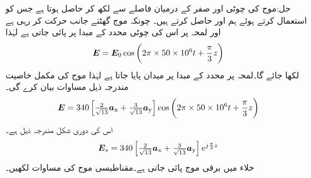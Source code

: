 حل:موج کی چوٹی اور صفر کے درمیان فاصلے سے  لکھ کر  حاصل ہوتا ہے جس کو استعمال کرتے ہوئے ہم    اور  حاصل کرتے  ہیں۔ چونکہ موج گھٹتے  جانب حرکت کر رہی ہے اور لمحہ  پر اس کی چوٹی محدد کے مبدا پر پائی جاتی ہے  لہٰذا 
\begin{align*}
{\ensuremath{{\boldsymbol{E}}}}={{\boldsymbol{E}}}_0 \cos \left(2\pi \times 50 \times 10^6 t + \frac{\pi}{3} z \right)
\end{align*}
لکھا جائے گا۔لمحہ  پر محدد کے مبدا پر میدان  پایا جاتا ہے لہٰذا موج کی مکمل خاصیت مندرجہ ذیل مساوات بیان کرے گی۔ 
\begin{align*}
{\ensuremath{{\boldsymbol{E}}}}=340\left[\tfrac{2}{\sqrt{13}}{\boldsymbol{a}}_{\textup{x}}+\tfrac{3}{\sqrt{13}}{\boldsymbol{a}}_{\textup{y}}\right] \cos \left(2\pi \times 50 \times 10^6 t + \frac{\pi}{3} z \right)
\end{align*}
اس کی دوری شکل مندرجہ ذیل ہے۔
\begin{align*}
{\ensuremath{{\boldsymbol{E}}}}_s=340\left[\tfrac{2}{\sqrt{13}}{\boldsymbol{a}}_{\textup{x}}+\tfrac{3}{\sqrt{13}}{\boldsymbol{a}}_{\textup{y}}\right] e^{j\frac{\pi}{3} z}
\end{align*}
خلاء میں برقی موج  پائی جاتی ہے۔مقناطیسی موج کی مساوات لکھیں۔

